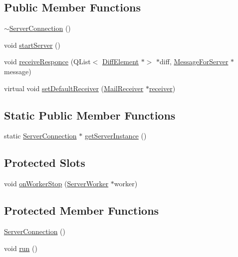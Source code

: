 \subsection*{Public Member Functions}
\begin{DoxyCompactItemize}
\item 
\hyperlink{a00181_af919491d0e2ff066b0a58cc50fc0d90d}{$\sim$\+Server\+Connection} ()
\item 
void \hyperlink{a00181_a1d45a6a7b2370c82ed2849959bb18c2a}{start\+Server} ()
\item 
void \hyperlink{a00181_afd1dd14f38c6c1d1efa719af1a9d9851}{receive\+Responce} (Q\+List$<$ \hyperlink{a00141}{Diff\+Element} $\ast$$>$ $\ast$diff, \hyperlink{a00121}{Message\+For\+Server} $\ast$message)
\item 
virtual void \hyperlink{a00205_aa85db0004c26606c5ac294e5de000b96}{set\+Default\+Receiver} (\hyperlink{a00197}{Mail\+Receiver} $\ast$\hyperlink{a00205_aa57ce2f74f8ad76abb38974f85b97ac5}{receiver})
\end{DoxyCompactItemize}
\subsection*{Static Public Member Functions}
\begin{DoxyCompactItemize}
\item 
static \hyperlink{a00181}{Server\+Connection} $\ast$ \hyperlink{a00181_ad64d541093e285a983911f22ab9a0bff}{get\+Server\+Instance} ()
\end{DoxyCompactItemize}
\subsection*{Protected Slots}
\begin{DoxyCompactItemize}
\item 
void \hyperlink{a00181_af558fe509b60eb019281316513f6d188}{on\+Worker\+Stop} (\hyperlink{a00185}{Server\+Worker} $\ast$worker)
\end{DoxyCompactItemize}
\subsection*{Protected Member Functions}
\begin{DoxyCompactItemize}
\item 
\hyperlink{a00181_a0adf644e7715ddbb83a53651b0804dec}{Server\+Connection} ()
\item 
void \hyperlink{a00181_ac7f219a30789e91afa079ab5e49529bd}{run} ()
\end{DoxyCompactItemize}
